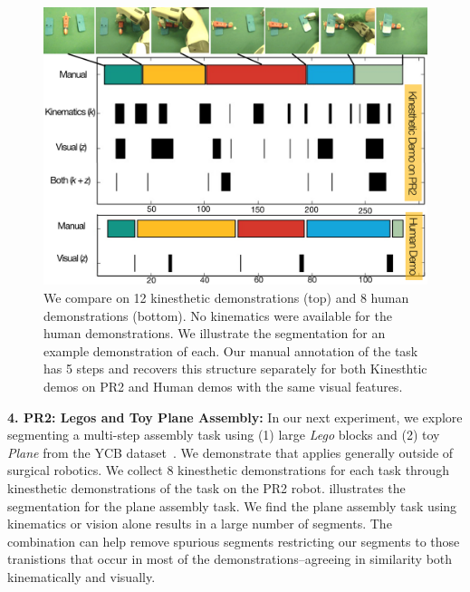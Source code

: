 \documentclass[0-main.tex]{subfiles}
\begin{document}
\begin{figure}[!t]
\centering
\includegraphics[width=\linewidth]{figures/pr2_plane_assembly-v5}
\caption{We compare \tsc on 12 kinesthetic demonstrations (top) and
8 human demonstrations (bottom).
No kinematics were available for the human demonstrations.
We illustrate the segmentation for an example demonstration of each.
Our manual annotation of the task has 5 steps and \tsc recovers this structure separately for both Kinesthtic demos on PR2 and Human demos with the same visual features. }
\vspace{-20pt}
\end{figure}

\vspace{5pt}
\noindent \textbf{4. PR2: Legos and Toy Plane Assembly: }
In our next experiment, we explore segmenting a multi-step assembly task using (1) large \textit{Lego} blocks and (2) toy \textit{Plane} from the YCB dataset~\cite{calli2015corr}. 
We demonstrate that \tsc applies generally outside of surgical robotics.
We collect 8 kinesthetic demonstrations for each task through kinesthetic demonstrations of the task on the PR2 robot.
 illustrates the segmentation for the plane assembly task.
We find the plane assembly task using kinematics or vision alone results in a large number of segments.
The combination can help remove spurious segments restricting our segments to those tranistions that occur in most of the demonstrations--agreeing in similarity both kinematically and visually.
\end{document}
